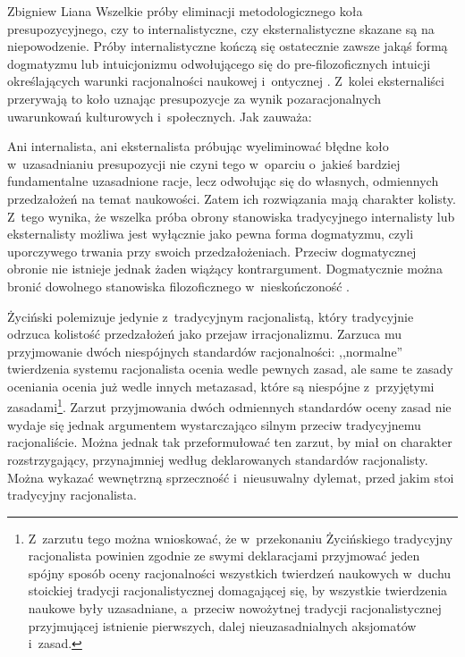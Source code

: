 \begin{artplenv}{Zbigniew Liana}
Wszelkie próby eliminacji metodologicznego koła presupozycyjnego, czy to internalistyczne, czy eksternalistyczne skazane są na niepowodzenie. Próby internalistyczne kończą się ostatecznie zawsze jakąś formą dogmatyzmu lub intuicjonizmu odwołującego się do pre-filozoficznych intuicji określających warunki racjonalności naukowej i~ontycznej
\parencite[][s.~129.172]{zycinski_teizm_1985}. %
 Z~kolei eksternaliści przerywają to koło uznając presupozycje za wynik pozaracjonalnych uwarunkowań kulturowych i~społecznych. Jak zauważa:


Ani internalista, ani eksternalista próbując wyeliminować błędne koło w~uzasadnianiu presupozycji nie czyni tego w~oparciu o~jakieś bardziej fundamentalne uzasadnione racje, lecz odwołując się do własnych, odmiennych przedzałożeń na temat naukowości. Zatem ich rozwiązania mają charakter kolisty. Z~tego wynika, że wszelka próba obrony stanowiska tradycyjnego internalisty lub eksternalisty możliwa jest wyłącznie jako pewna forma dogmatyzmu, czyli uporczywego trwania przy swoich przedzałożeniach. Przeciw dogmatycznej obronie nie istnieje jednak żaden wiążący kontrargument. Dogmatycznie można bronić dowolnego stanowiska filozoficznego w~nieskończoność
\parencite[][s.~129]{zycinski_teizm_1985}.%


Życiński polemizuje jedynie z~tradycyjnym racjonalistą, który tradycyjnie odrzuca kolistość przedzałożeń jako przejaw irracjonalizmu. Zarzuca mu
\parencite[][s.~156n]{zycinski_teizm_1985} %
 przyjmowanie dwóch niespójnych standardów racjonalności: ,,normalne'' twierdzenia systemu racjonalista ocenia wedle pewnych zasad, ale same te zasady oceniania ocenia już wedle innych metazasad, które są niespójne z~przyjętymi zasadami\footnote{Z~zarzutu tego można wnioskować, że w~przekonaniu Życińskiego tradycyjny racjonalista powinien zgodnie ze swymi deklaracjami przyjmować jeden spójny sposób oceny racjonalności wszystkich twierdzeń naukowych w~duchu stoickiej tradycji racjonalistycznej domagającej się, by wszystkie twierdzenia naukowe były uzasadniane, a~przeciw nowożytnej tradycji racjonalistycznej przyjmującej istnienie pierwszych, dalej nieuzasadnialnych aksjomatów i~zasad.}. Zarzut przyjmowania dwóch odmiennych standardów oceny zasad nie wydaje się jednak argumentem wystarczająco silnym przeciw tradycyjnemu racjonaliście. Można jednak tak przeformułować ten zarzut, by miał on charakter rozstrzygający, przynajmniej według deklarowanych standardów racjonalisty. Można wykazać wewnętrzną sprzeczność i~nieusuwalny dylemat, przed jakim stoi tradycyjny racjonalista.


\end{artplenv}
